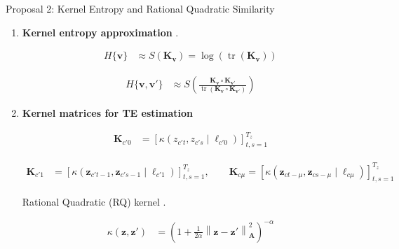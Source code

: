 \documentclass[aspectratio=169]{beamer}
\let\oldcite\cite
\renewcommand{\cite}[1]{{\tiny\oldcite{#1}}}
\begin{document}
\begin{frame}{Proposal 2: Kernel Entropy and Rational Quadratic Similarity}
\scriptsize
\setlength{\abovedisplayskip}{2pt}
\setlength{\belowdisplayskip}{2pt}
\setlength{\jot}{2pt}

\begin{enumerate}
\setlength{\itemsep}{0.08cm}

\item \textbf{Kernel entropy approximation}
{\scriptsize \cite{giraldo2015measures}.}

\begin{align*}
H\{\mathbf{v}\}
&\approx
S(\mathbf{K}_{\mathbf{v}})
=
\log
\left(
\operatorname{tr}
\left(
\mathbf{K}_{\mathbf{v}}
\right)
\right)
\end{align*}

\begin{align*}
H\{\mathbf{v},\mathbf{v}'\}
&\approx
S\left(
\frac{
\mathbf{K}_{\mathbf{v}}
\circ
\mathbf{K}_{\mathbf{v}'}
}{
\operatorname{tr}
\left(
\mathbf{K}_{\mathbf{v}}
\circ
\mathbf{K}_{\mathbf{v}'}
\right)
}
\right)
\end{align*}

\item \textbf{Kernel matrices for TE estimation}

\begin{align*}
\mathbf{K}_{c'0}
&=
\left[
\kappa
\left(
z_{c't},
z_{c's}
\mid
\ell_{c'0}
\right)
\right]_{t,s=1}^{T_z}
\end{align*}

\begin{align*}
\mathbf{K}_{c'1}
&=
\left[
\kappa
\left(
\mathbf{z}_{c't-1},
\mathbf{z}_{c's-1}
\mid
\ell_{c'1}
\right)
\right]_{t,s=1}^{T_z},
\qquad
\mathbf{K}_{c\mu}
=
\left[
\kappa
\left(
\mathbf{z}_{ct-\mu},
\mathbf{z}_{cs-\mu}
\mid
\ell_{c\mu}
\right)
\right]_{t,s=1}^{T_z}
\end{align*}


\begin{block}{Rational Quadratic (RQ) kernel {\scriptsize \cite{rasmussen2006gaussian}.}}

\begin{align*}
\kappa(\mathbf{z},\mathbf{z}')
&=
\left(
1+
\frac{1}{2\alpha}
\left\|
\mathbf{z}-\mathbf{z}'
\right\|_{\mathbf{A}}^2
\right)^{-\alpha}
\end{align*}


\end{block}
\end{enumerate}
\end{frame}
\end{document}
